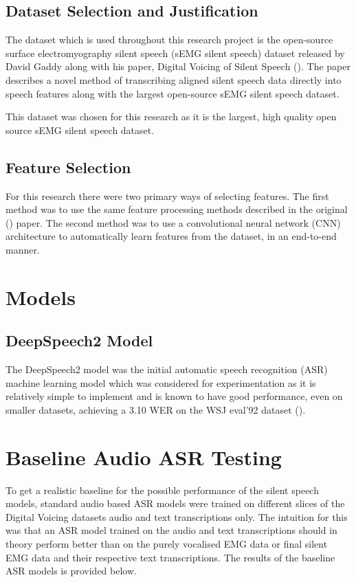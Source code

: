 \subsection{Dataset Selection and Justification}

The dataset which is used throughout this research project is the open-source
surface electromyography silent speech (sEMG silent speech) dataset released
by David Gaddy along with his paper, Digital Voicing of Silent Speech
(\cite{gaddy2020digital}).
The paper describes a novel method of transcribing aligned silent speech data
directly into speech features along with the largest open-source sEMG silent
speech dataset.

This dataset was chosen for this research as it is the largest, high quality open
source sEMG silent speech dataset.

\subsection{Feature Selection}

For this research there were two primary ways of selecting features. The first method
was to use the same feature processing methods described in the original
(\cite{gaddy2020digital}) paper. The second method was to use a convolutional
neural network (CNN) architecture to automatically learn features from the
dataset, in an end-to-end manner.

\section{Models}

\subsection{DeepSpeech2 Model}

The DeepSpeech2 model was the initial automatic speech recognition (ASR) machine
learning model which was considered for experimentation as it is relatively simple to
implement and is known to have good performance, even on smaller datasets, achieving
a 3.10 WER on the WSJ eval'92 dataset
(\cite{DS2_original}).

\section{Baseline Audio ASR Testing}

To get a realistic baseline for the possible performance of the silent
speech models, standard audio based ASR models were trained on different
slices of the Digital Voicing datasets audio and text transcriptions only.
The intuition for this was that an ASR model trained on the audio and text
transcriptions should in theory perform better than on the purely vocalised
EMG data or final silent EMG data and their respective text transcriptions.
The results of the baseline ASR models is provided below.

